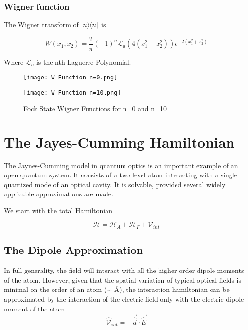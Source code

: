 \subsubsection{Wigner function}
The Wigner transform of $| n \rangle\langle n |$ is\cite[65]{Walls2008}

\begin{equation}
	W(x_1, x_2) = \frac{2}{\pi} {(-1)}^n \mathscr{L}_n(4(x_1^2+x_2^2))e^{-2(x_1^2+x_2^2)}
\end{equation}

Where $\mathscr{L}_n$ is the nth Laguerre Polynomial.

\begin{figure}[ht]
	\begin{minipage}[b]{.5\linewidth}
		\centering \large \texttt{[image: W Function-n=0.png]}
	\end{minipage}%
	\begin{minipage}[b]{.5\linewidth}
		\centering\large \texttt{[image: W Function-n=10.png]}
	\end{minipage}
	\caption{Fock State Wigner Functions for n=0 and n=10}\label{Wfunctions}
\end{figure}

\section{The Jayes-Cumming Hamiltonian}
The Jaynes-Cumming model in quantum optics is an important example of an open quantum system.
It consists of a two level atom interacting with a single quantized mode of an optical cavity.
It is solvable, provided several widely applicable approximations are made.

We start with the total Hamiltonian

\begin{equation}
	\mathscr{H} = \mathscr{H}_A + \mathscr{H}_F +\mathscr{V}_{int}
\end{equation}

\subsection{The Dipole Approximation}
In full generality, the field will interact with all the higher order dipole moments of the atom.
However, given that the spatial variation of typical optical fields is minimal on the order of an atom ($\sim$ \AA), the interaction hamiltonian can be approximated by the interaction of the electric field only with the electric dipole moment of the atom
%
\begin{equation}
	\hat{\mathscr{V}}_{int} = -\vec{\hat{d}} \cdot \vec{\hat{E}}
\end{equation}

